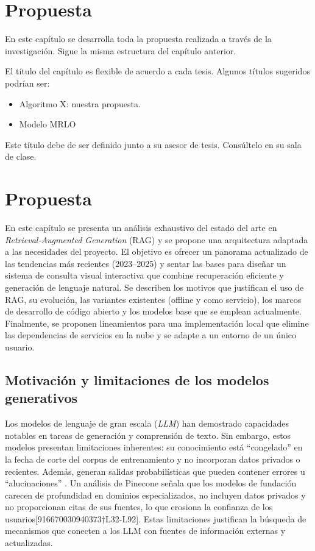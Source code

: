 \chapter{Propuesta}\label{chap:proposal}

En este capítulo se desarrolla toda la propuesta realizada a través de la investigación. Sigue la misma estructura del capítulo anterior.

El título del capítulo es flexible de acuerdo a cada tesis. Algunos títulos sugeridos podrían ser:

\begin{itemize}
\item Algoritmo X: nuestra propuesta.
\item Modelo MRLO
\end{itemize}

Este título debe de ser definido junto a su asesor de tesis. Consúltelo en su sala de clase.
\chapter{Propuesta}
\label{chap:proposal}

En este capítulo se presenta un análisis exhaustivo del estado del arte en \textit{Retrieval‑Augmented Generation} (RAG) y se propone una arquitectura adaptada a las necesidades del proyecto.  El objetivo es ofrecer un panorama actualizado de las tendencias más recientes (2023–2025) y sentar las bases para diseñar un sistema de consulta visual interactiva que combine recuperación eficiente y generación de lenguaje natural.  Se describen los motivos que justifican el uso de RAG, su evolución, las variantes existentes (offline y como servicio), los marcos de desarrollo de código abierto y los modelos base que se emplean actualmente.  Finalmente, se proponen lineamientos para una implementación local que elimine las dependencias de servicios en la nube y se adapte a un entorno de un único usuario.

\section{Motivación y limitaciones de los modelos generativos}

Los modelos de lenguaje de gran escala (\textit{LLM}) han demostrado capacidades notables en tareas de generación y comprensión de texto.  Sin embargo, estos modelos presentan limitaciones inherentes: su conocimiento está ``congelado'' en la fecha de corte del corpus de entrenamiento y no incorporan datos privados o recientes.  Además, generan salidas probabilísticas que pueden contener errores u ``alucinaciones'' \cite{pinecone2025guide}.  Un análisis de Pinecone señala que los modelos de fundación carecen de profundidad en dominios especializados, no incluyen datos privados y no proporcionan citas de sus fuentes, lo que erosiona la confianza de los usuarios[916670030940373†L32-L92].  Estas limitaciones justifican la búsqueda de mecanismos que conecten a los LLM con fuentes de información externas y actualizadas.

